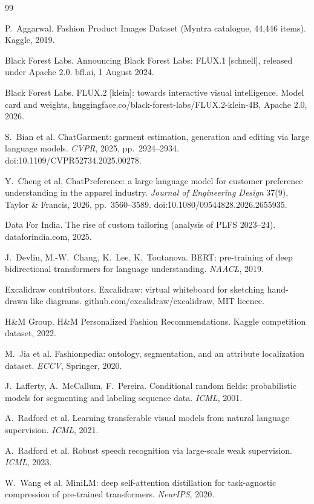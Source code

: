 \begingroup
\small
\renewcommand{\bibname}{References}
\begin{thebibliography}{99}
\setlength{\itemsep}{3pt}

 P.~Aggarwal. Fashion Product Images Dataset (Myntra catalogue, 44,446 items). Kaggle, 2019.

 Black Forest Labs. Announcing Black Forest Labs: FLUX.1 [schnell], released under Apache 2.0. bfl.ai, 1 August 2024.

 Black Forest Labs. FLUX.2 [klein]: towards interactive visual intelligence. Model card and weights, huggingface.co/black-forest-labs/FLUX.2-klein-4B, Apache 2.0, 2026.

 S.~Bian et al. ChatGarment: garment estimation, generation and editing via large language models. \emph{CVPR}, 2025, pp.~2924--2934. doi:10.1109/CVPR52734.2025.00278.

 Y.~Cheng et al. ChatPreference: a large language model for customer preference understanding in the apparel industry. \emph{Journal of Engineering Design} 37(9), Taylor \& Francis, 2026, pp.~3560--3589. doi:10.1080/09544828.2026.2655935.

 Data For India. The rise of custom tailoring (analysis of PLFS 2023--24). dataforindia.com, 2025.

 J.~Devlin, M.-W.~Chang, K.~Lee, K.~Toutanova. BERT: pre-training of deep bidirectional transformers for language understanding. \emph{NAACL}, 2019.

 Excalidraw contributors. Excalidraw: virtual whiteboard for sketching hand-drawn like diagrams. github.com/excalidraw/excalidraw, MIT licence.

 H\&M Group. H\&M Personalized Fashion Recommendations. Kaggle competition dataset, 2022.

 M.~Jia et al. Fashionpedia: ontology, segmentation, and an attribute localization dataset. \emph{ECCV}, Springer, 2020.

 J.~Lafferty, A.~McCallum, F.~Pereira. Conditional random fields: probabilistic models for segmenting and labeling sequence data. \emph{ICML}, 2001.

 A.~Radford et al. Learning transferable visual models from natural language supervision. \emph{ICML}, 2021.

 A.~Radford et al. Robust speech recognition via large-scale weak supervision. \emph{ICML}, 2023.

 W.~Wang et al. MiniLM: deep self-attention distillation for task-agnostic compression of pre-trained transformers. \emph{NeurIPS}, 2020.

\end{thebibliography}
\endgroup
